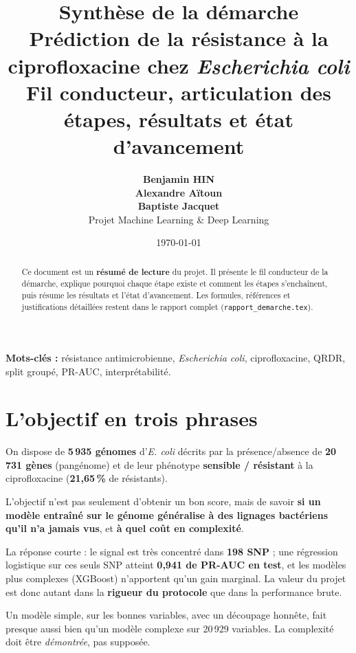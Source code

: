 \documentclass[11pt,a4paper]{article}
\title{
    \vspace{-1.2cm}
    \textbf{\LARGE Synthèse de la démarche}\\[0.35cm]
    \large Prédiction de la résistance à la ciprofloxacine chez \textit{Escherichia coli}\\[0.2cm]
    \normalsize Fil conducteur, articulation des étapes, résultats et état d'avancement
}
\author{
    \textbf{Benjamin HIN}\\
    \textbf{Alexandre Aïtoun}\\
    \textbf{Baptiste Jacquet}\\
    Projet Machine Learning \& Deep Learning
}
\date{\today}
\begin{document}
\maketitle
\thispagestyle{empty}

\begin{abstract}
\noindent
Ce document est un \textbf{résumé de lecture} du projet. Il présente le fil conducteur de la démarche, explique pourquoi chaque étape existe et comment les étapes s'enchaînent, puis résume les résultats et l'état d'avancement. Les formules, références et justifications détaillées restent dans le rapport complet (\texttt{rapport\_demarche.tex}).
\end{abstract}

\vspace{0.2cm}
\noindent\textbf{Mots-clés :} résistance antimicrobienne, \textit{Escherichia coli}, ciprofloxacine, QRDR, split groupé, PR-AUC, interprétabilité.

\vspace{0.4cm}
\tableofcontents

\newpage

\section{L'objectif en trois phrases}

On dispose de \textbf{5\,935 génomes} d'\textit{E. coli} décrits par la présence/absence de \textbf{20\,731 gènes} (pangénome) et de leur phénotype \textbf{sensible / résistant} à la ciprofloxacine (\textbf{21,65\,\%} de résistants).

L'objectif n'est pas seulement d'obtenir un bon score, mais de savoir \textbf{si un modèle entraîné sur le génome généralise à des lignages bactériens qu'il n'a jamais vus}, et \textbf{à quel coût en complexité}.

La réponse courte : le signal est très concentré dans \textbf{198 SNP} ; une régression logistique sur ces seuls SNP atteint \textbf{0,941 de PR-AUC en test}, et les modèles plus complexes (XGBoost) n'apportent qu'un gain marginal. La valeur du projet est donc autant dans la \textbf{rigueur du protocole} que dans la performance brute.

\begin{keybox}
Un modèle simple, sur les bonnes variables, avec un découpage honnête, fait presque aussi bien qu'un modèle complexe sur 20\,929 variables. La complexité doit être \emph{démontrée}, pas supposée.
\end{keybox}
\end{document}
